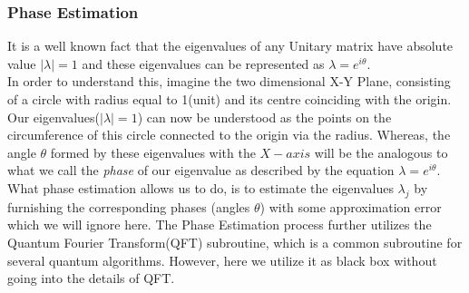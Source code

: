 \documentclass[12pt]{article}
\begin{document}
\subsubsection{Phase Estimation}
It is a well known fact that the eigenvalues of any Unitary matrix have absolute value $|\lambda| = 1$ and these eigenvalues can be represented as $\lambda = e^{i\theta}$.\\
In order to understand this, imagine the two dimensional X-Y Plane, consisting of a circle with radius equal to 1(unit) and its centre coinciding with the origin.\\
Our eigenvalues($|\lambda| = 1$) can now be understood as the points on the circumference of this circle connected to the origin via the radius. Whereas, the angle $\theta$ formed by these eigenvalues with the $X-axis$ will be the analogous to what we call the \emph{phase} of our eigenvalue as described by the equation $\lambda = e^{i\theta}$.\\
What phase estimation allows us to do, is to estimate the eigenvalues $\lambda_j$ by furnishing the corresponding phases (angles $\theta$) with some approximation error which we will ignore here. The Phase Estimation process further utilizes the Quantum Fourier Transform(QFT) subroutine, which is a common subroutine for several quantum algorithms. However, here we utilize it as black box without going into the details of QFT.\\ 
\end{document}
